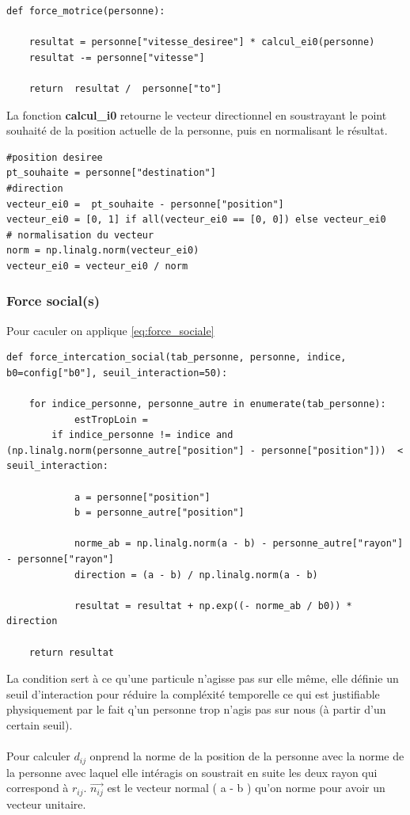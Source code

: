 \documentclass[a4paper,12pt]{article}
\begin{document}
\begin{verbatim}
def force_motrice(personne):
    
    resultat = personne["vitesse_desiree"] * calcul_ei0(personne) 
    resultat -= personne["vitesse"]

    return  resultat /  personne["to"]
\end{verbatim}

La fonction \textbf{calcul\_i0} retourne le vecteur directionnel en soustrayant le point souhaité de la position actuelle de la personne, puis en normalisant le résultat.
\begin{verbatim}
#position desiree
pt_souhaite = personne["destination"]
#direction 
vecteur_ei0 =  pt_souhaite - personne["position"]
vecteur_ei0 = [0, 1] if all(vecteur_ei0 == [0, 0]) else vecteur_ei0
# normalisation du vecteur
norm = np.linalg.norm(vecteur_ei0)
vecteur_ei0 = vecteur_ei0 / norm
\end{verbatim}

\subsubsection{Force social(s)}

Pour caculer on applique \eqref{eq:force_sociale}

\begin{verbatim}
def force_intercation_social(tab_personne, personne, indice, b0=config["b0"], seuil_interaction=50):

    for indice_personne, personne_autre in enumerate(tab_personne):
    		estTropLoin = 
        if indice_personne != indice and (np.linalg.norm(personne_autre["position"] - personne["position"]))  < seuil_interaction:

            a = personne["position"]
            b = personne_autre["position"]

            norme_ab = np.linalg.norm(a - b) - personne_autre["rayon"] - personne["rayon"]
			direction = (a - b) / np.linalg.norm(a - b)
			
            resultat = resultat + np.exp((- norme_ab / b0)) * direction

    return resultat
\end{verbatim}

La condition sert à ce qu'une particule n'agisse pas sur elle même, elle définie un seuil d'interaction pour réduire la compléxité temporelle ce qui est justifiable physiquement par le fait q'un personne trop n'agis pas sur nous (à partir d'un certain seuil).
\\
\\
Pour calculer $d_{ij}$ onprend la norme de la position de la personne avec la norme de la personne avec laquel elle intéragis on soustrait en suite les deux rayon qui correspond à $r_{ij}$. $\vec{n_{ij}}$ est le vecteur normal ( a - b ) qu'on norme pour avoir un vecteur unitaire. 
\end{document}
